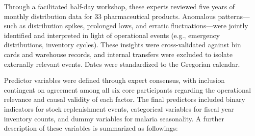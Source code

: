 \documentclass[
  authoryear,
  preprint,
  3p]{elsarticle}
\begin{document}
Through a facilitated half-day workshop, these experts reviewed five
years of monthly distribution data for 33 pharmaceutical products.
Anomalous patterns---such as distribution spikes, prolonged lows, and
erratic fluctuations---were jointly identified and interpreted in light
of operational events (e.g., emergency distributions, inventory cycles).
These insights were cross-validated against bin cards and warehouse
records, and internal transfers were excluded to isolate externally
relevant events. Dates were standardized to the Gregorian calendar.

Predictor variables were defined through expert consensus, with
inclusion contingent on agreement among all six core participants
regarding the operational relevance and causal validity of each factor.
The final predictors included binary indicators for stock replenishment
events, categorical variables for fiscal year inventory counts, and
dummy variables for malaria seasonality. A further description of these
variables is summarized as followings:
\end{document}

